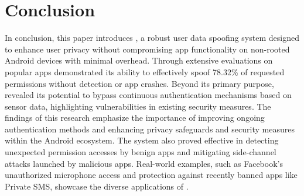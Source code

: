 \section{Conclusion}
\label{sec:conclusion}

In conclusion, this paper introduces \framework{}, a robust user data spoofing system designed to enhance user privacy without compromising app functionality on non-rooted Android devices with minimal overhead. Through extensive evaluations on popular apps \framework{} demonstrated its ability to effectively spoof 78.32\% of requested permissions without detection or app crashes. Beyond its primary purpose, \framework{} revealed its potential to bypass continuous authentication mechanisms based on sensor data, highlighting vulnerabilities in existing security measures. The findings of this research emphasize the importance of improving ongoing authentication methods and enhancing privacy safeguards and security measures within the Android ecosystem. The system also proved effective in detecting unexpected permission accesses by benign apps and mitigating side-channel attacks launched by malicious apps. Real-world examples, such as Facebook's unauthorized microphone access and protection against recently banned apps like Private SMS, showcase the diverse applications of \framework{}. 